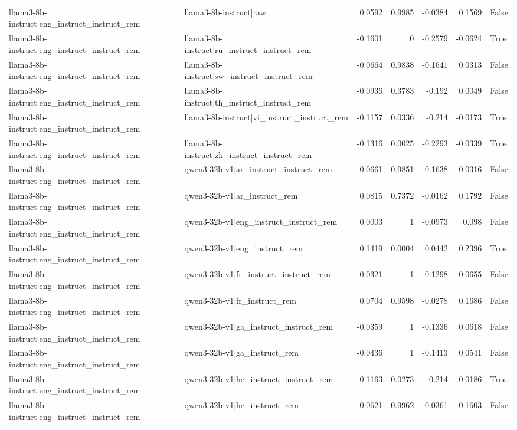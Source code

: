 \begin{table}
\begin{tabular}{l l r r r r l}
llama3-8b-instruct|eng_instruct_instruct_rem & llama3-8b-instruct|raw & 0.0592 & 0.9985 & -0.0384 & 0.1569 & False \\
llama3-8b-instruct|eng_instruct_instruct_rem & llama3-8b-instruct|ru_instruct_instruct_rem & -0.1601 & 0 & -0.2579 & -0.0624 & True \\
llama3-8b-instruct|eng_instruct_instruct_rem & llama3-8b-instruct|sw_instruct_instruct_rem & -0.0664 & 0.9838 & -0.1641 & 0.0313 & False \\
llama3-8b-instruct|eng_instruct_instruct_rem & llama3-8b-instruct|th_instruct_instruct_rem & -0.0936 & 0.3783 & -0.192 & 0.0049 & False \\
llama3-8b-instruct|eng_instruct_instruct_rem & llama3-8b-instruct|vi_instruct_instruct_rem & -0.1157 & 0.0336 & -0.214 & -0.0173 & True \\
llama3-8b-instruct|eng_instruct_instruct_rem & llama3-8b-instruct|zh_instruct_instruct_rem & -0.1316 & 0.0025 & -0.2293 & -0.0339 & True \\
llama3-8b-instruct|eng_instruct_instruct_rem & qwen3-32b-v1|ar_instruct_instruct_rem & -0.0661 & 0.9851 & -0.1638 & 0.0316 & False \\
llama3-8b-instruct|eng_instruct_instruct_rem & qwen3-32b-v1|ar_instruct_rem & 0.0815 & 0.7372 & -0.0162 & 0.1792 & False \\
llama3-8b-instruct|eng_instruct_instruct_rem & qwen3-32b-v1|eng_instruct_instruct_rem & 0.0003 & 1 & -0.0973 & 0.098 & False \\
llama3-8b-instruct|eng_instruct_instruct_rem & qwen3-32b-v1|eng_instruct_rem & 0.1419 & 0.0004 & 0.0442 & 0.2396 & True \\
llama3-8b-instruct|eng_instruct_instruct_rem & qwen3-32b-v1|fr_instruct_instruct_rem & -0.0321 & 1 & -0.1298 & 0.0655 & False \\
llama3-8b-instruct|eng_instruct_instruct_rem & qwen3-32b-v1|fr_instruct_rem & 0.0704 & 0.9598 & -0.0278 & 0.1686 & False \\
llama3-8b-instruct|eng_instruct_instruct_rem & qwen3-32b-v1|ga_instruct_instruct_rem & -0.0359 & 1 & -0.1336 & 0.0618 & False \\
llama3-8b-instruct|eng_instruct_instruct_rem & qwen3-32b-v1|ga_instruct_rem & -0.0436 & 1 & -0.1413 & 0.0541 & False \\
llama3-8b-instruct|eng_instruct_instruct_rem & qwen3-32b-v1|he_instruct_instruct_rem & -0.1163 & 0.0273 & -0.214 & -0.0186 & True \\
llama3-8b-instruct|eng_instruct_instruct_rem & qwen3-32b-v1|he_instruct_rem & 0.0621 & 0.9962 & -0.0361 & 0.1603 & False \\

\end{tabular}
\end{table}
